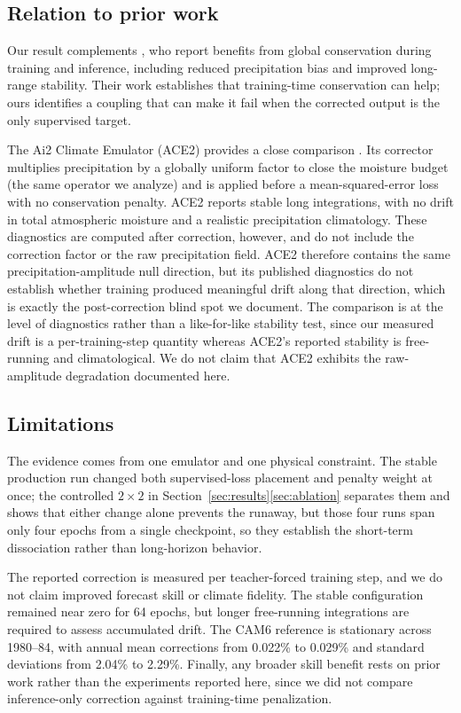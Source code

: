 \documentclass{ametsocV6.1}
\begin{document}
\subsection{Relation to prior work}\label{sec:prior}

Our result complements \citet{sha2025}, who report benefits from global conservation during training and inference, including reduced precipitation bias and improved long-range stability. Their work establishes that training-time conservation can help; ours identifies a coupling that can make it fail when the corrected output is the only supervised target.

The Ai2 Climate Emulator (ACE2) provides a close comparison \citep{wattmeyer2025}. Its corrector multiplies precipitation by a globally uniform factor to close the moisture budget (the same operator we analyze) and is applied before a mean-squared-error loss with no conservation penalty. ACE2 reports stable long integrations, with no drift in total atmospheric moisture and a realistic precipitation climatology. These diagnostics are computed after correction, however, and do not include the correction factor or the raw precipitation field. ACE2 therefore contains the same precipitation-amplitude null direction, but its published diagnostics do not establish whether training produced meaningful drift along that direction, which is exactly the post-correction blind spot we document. The comparison is at the level of diagnostics rather than a like-for-like stability test, since our measured drift is a per-training-step quantity whereas ACE2's reported stability is free-running and climatological. We do not claim that ACE2 exhibits the raw-amplitude degradation documented here.

\subsection{Limitations}\label{sec:limits}

The evidence comes from one emulator and one physical constraint. The stable production run changed both supervised-loss placement and penalty weight at once; the controlled $2\times2$ in Section~\ref{sec:results}\ref{sec:ablation} separates them and shows that either change alone prevents the runaway, but those four runs span only four epochs from a single checkpoint, so they establish the short-term dissociation rather than long-horizon behavior.

The reported correction is measured per teacher-forced training step, and we do not claim improved forecast skill or climate fidelity. The stable configuration remained near zero for 64 epochs, but longer free-running integrations are required to assess accumulated drift. The CAM6 reference is stationary across 1980--84, with annual mean corrections from 0.022\% to 0.029\% and standard deviations from 2.04\% to 2.29\%. Finally, any broader skill benefit rests on prior work rather than the experiments reported here, since we did not compare inference-only correction against training-time penalization.
\end{document}
